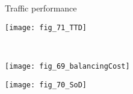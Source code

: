 \begin{frame}{Traffic performance}
    \begin{center}
        \begin{minipage}[c]{0.45\textwidth}
        \texttt{[image: fig\_71\_TTD]}%
        \end{minipage}
        ~
        \begin{minipage}[c]{0.3\textwidth}
        \texttt{[image: fig\_69\_balancingCost]}%
        \end{minipage}%
    \end{center}
    \begin{center}
        \texttt{[image: fig\_70\_SoD]}
    \end{center}
\end{frame}